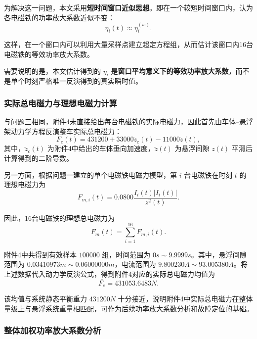 \documentclass[a4paper]{nmmcm}
\begin{document}
为解决这一问题，本文采用\textbf{短时间窗口近似思想}。即在一个较短时间窗口内，认为各电磁铁的功率放大系数近似不变：
\begin{equation}
\eta_i(t)\approx \eta_i^{(w)}.
\end{equation}

这样，在一个窗口内可以利用大量采样点建立超定方程组，从而估计该窗口内16台电磁铁的等效功率放大系数。

需要说明的是，本文估计得到的 $\eta_i$ 是\textbf{窗口平均意义下的等效功率放大系数}，而不是单个时刻严格唯一反演得到的真实瞬时值。

\subsubsection{实际总电磁力与理想电磁力计算}

与问题三相同，附件4未直接给出每台电磁铁的实际电磁力，因此首先由车体--悬浮架动力学方程反演整车实际总电磁力：
\begin{equation}
F_e(t)=431200+33000\ddot{z}_c(t)-11000\ddot{z}(t),
\end{equation}
其中，$\ddot{z}_c(t)$ 为附件4中给出的车体垂向加速度，$\ddot{z}(t)$ 为悬浮间隙 $z(t)$ 平滑后计算得到的二阶导数。

另一方面，根据问题一建立的单个电磁铁电磁力模型，第 $i$ 台电磁铁在时刻 $t$ 的理想电磁力为
\begin{equation}
F_{m,i}(t)=0.0800\frac{I_i(t)|I_i(t)|}{z^2(t)}.
\end{equation}

因此，16台电磁铁的理想总电磁力为
\begin{equation}
F_m(t)=\sum_{i=1}^{16}F_{m,i}(t).
\end{equation}

附件4中共得到有效样本 $100000$ 组，时间范围为 $0s\sim9.9999s$。其中，悬浮间隙范围为 $0.03410973m\sim0.06000000m$，电流范围为 $9.800230A\sim93.005380A$。将上述数据代入动力学反演公式，得到附件4对应的实际总电磁力均值为
\begin{equation}
\overline{F_e}=431053.6483N.
\end{equation}

该均值与系统静态平衡重力 $431200N$ 十分接近，说明附件4中实际总电磁力在整体量级上与悬浮系统重量相匹配，可作为后续功率放大系数分析和故障定位的基础。

\subsubsection{整体加权功率放大系数分析}
\end{document}
